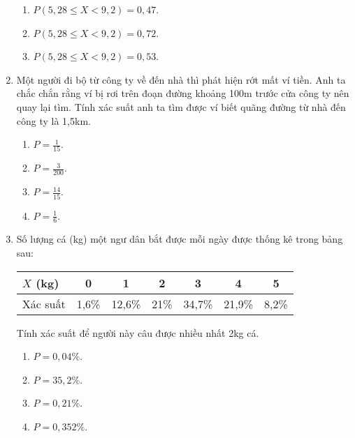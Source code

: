 \begin{enumerate}[label=\textbf{Câu \arabic*.},align=left,left=0cm..0cm,itemindent=*]
\begin{enumerate}[label=\textbf{\Alph*.},align=left,left=1cm..0cm,itemindent=*]
		\item $P\left( 5,28\leqslant X<9,2 \right)=0,47$.
		\item $P\left( 5,28\leqslant X<9,2 \right)=0,72$.
		\item $P\left( 5,28\leqslant X<9,2 \right)=0,53$.
	\end{enumerate}
	\item Một người đi bộ từ công ty về đến nhà thì phát hiện rớt mất ví tiền. Anh ta chắc chắn rằng ví bị rơi trên đoạn đường khoảng 100m trước cửa công ty nên quay lại tìm. Tính xác suất anh ta tìm được ví biết quãng đường từ nhà đến công ty là 1,5km.
	\begin{multicols}{4}\begin{enumerate}[label=\textbf{\Alph*.},align=left,left=1cm..0cm,itemindent=*]
		\item $P=\frac 1{15}$. \item $P=\frac 3{200}$. \item $P=\frac {14}{15}$. \item $P=\frac 16$.
	\end{enumerate}\end{multicols}
	\item Số lượng cá (kg) một ngư dân bắt được mỗi ngày được thống kê trong bảng sau:
	\begin{longtable}{|l|c|c|c|c|c|c|}\hline
	$X$ (kg) & 0 	 & 1 	  & 2 	& 3 	  & 4 	  & 5 	 \\\hline
	Xác suất & 1,6\% & 12,6\% & 21\% & 34,7\% & 21,9\% & 8,2\% \\\hline
	\end{longtable}
	Tính xác suất để người này câu được nhiều nhất 2kg cá.
	\begin{enumerate}[label=\textbf{\Alph*.},align=left,left=1cm..0cm,itemindent=*]
		\item $P=0,04\%$. \item $P=35,2\%$. \item $P=0,21\%$. \item $P=0,352\%$.
	\end{enumerate}
\end{enumerate}\par

